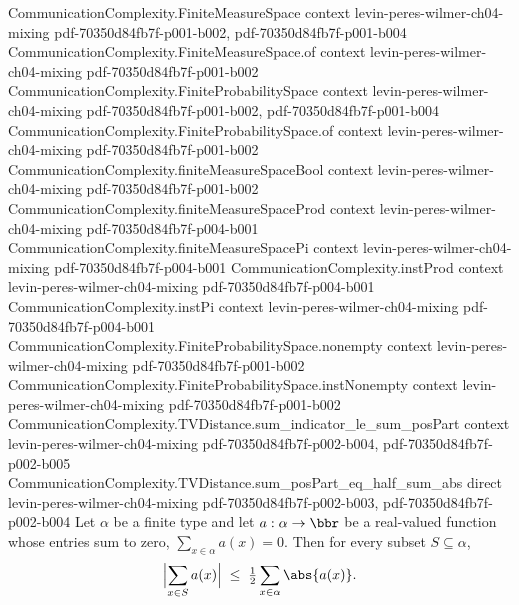 \begin{lemma}
\label{CommunicationComplexity.TVDistance.abs_sum_indicator_le_half_sum_abs}
\leanok
{}
\proofstep
  {CommunicationComplexity.FiniteMeasureSpace}
  {context}
  {levin-peres-wilmer-ch04-mixing}
  {pdf-70350d84fb7f-p001-b002,
    pdf-70350d84fb7f-p001-b004}
\proofstep
  {CommunicationComplexity.FiniteMeasureSpace.of}
  {context}
  {levin-peres-wilmer-ch04-mixing}
  {pdf-70350d84fb7f-p001-b002}
\proofstep
  {CommunicationComplexity.FiniteProbabilitySpace}
  {context}
  {levin-peres-wilmer-ch04-mixing}
  {pdf-70350d84fb7f-p001-b002,
    pdf-70350d84fb7f-p001-b004}
\proofstep
  {CommunicationComplexity.FiniteProbabilitySpace.of}
  {context}
  {levin-peres-wilmer-ch04-mixing}
  {pdf-70350d84fb7f-p001-b002}
\proofstep
  {CommunicationComplexity.finiteMeasureSpaceBool}
  {context}
  {levin-peres-wilmer-ch04-mixing}
  {pdf-70350d84fb7f-p001-b002}
\proofstep
  {CommunicationComplexity.finiteMeasureSpaceProd}
  {context}
  {levin-peres-wilmer-ch04-mixing}
  {pdf-70350d84fb7f-p004-b001}
\proofstep
  {CommunicationComplexity.finiteMeasureSpacePi}
  {context}
  {levin-peres-wilmer-ch04-mixing}
  {pdf-70350d84fb7f-p004-b001}
\proofstep
  {CommunicationComplexity.instProd}
  {context}
  {levin-peres-wilmer-ch04-mixing}
  {pdf-70350d84fb7f-p004-b001}
\proofstep
  {CommunicationComplexity.instPi}
  {context}
  {levin-peres-wilmer-ch04-mixing}
  {pdf-70350d84fb7f-p004-b001}
\proofstep
  {CommunicationComplexity.FiniteProbabilitySpace.nonempty}
  {context}
  {levin-peres-wilmer-ch04-mixing}
  {pdf-70350d84fb7f-p001-b002}
\proofstep
  {CommunicationComplexity.FiniteProbabilitySpace.instNonempty}
  {context}
  {levin-peres-wilmer-ch04-mixing}
  {pdf-70350d84fb7f-p001-b002}
\proofstep
  {CommunicationComplexity.TVDistance.sum_indicator_le_sum_posPart}
  {context}
  {levin-peres-wilmer-ch04-mixing}
  {pdf-70350d84fb7f-p002-b004,
    pdf-70350d84fb7f-p002-b005}
\proofstep
  {CommunicationComplexity.TVDistance.sum_posPart_eq_half_sum_abs}
  {direct}
  {levin-peres-wilmer-ch04-mixing}
  {pdf-70350d84fb7f-p002-b003,
    pdf-70350d84fb7f-p002-b004}
Let $\alpha$ be a finite type and let $a : \alpha \to \bbr$ be a real-valued function
whose entries sum to zero, $\sum_{x \in \alpha} a(x) = 0$. Then for every subset $S
\subseteq \alpha$,
\[
  \Bigl|\sum_{x \in S} a(x)\Bigr| \;\le\; \tfrac{1}{2} \sum_{x \in \alpha} \abs{a(x)}.
\]
\end{lemma}

